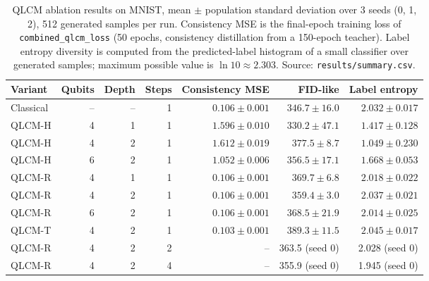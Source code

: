 \begin{table}[t]
\centering
\caption{QLCM ablation results on MNIST, mean $\pm$ population standard
deviation over 3 seeds (0, 1, 2), 512 generated samples per run. Consistency
MSE is the final-epoch training loss of \texttt{combined\_qlcm\_loss} (50
epochs, consistency distillation from a 150-epoch teacher). Label entropy
diversity is computed from the predicted-label histogram of a small
classifier over generated samples; maximum possible value is
$\ln 10 \approx 2.303$. Source: \texttt{results/summary.csv}.}
\label{tab:ablation}
\begin{tabular}{lrrrrrr}
\toprule
Variant & Qubits & Depth & Steps & Consistency MSE & FID-like & Label entropy \\
\midrule
Classical & -- & -- & 1 & $0.106 \pm 0.001$ & $346.7 \pm 16.0$ & $2.032 \pm 0.017$ \\
QLCM-H & 4 & 1 & 1 & $1.596 \pm 0.010$ & $330.2 \pm 47.1$ & $1.417 \pm 0.128$ \\
QLCM-H & 4 & 2 & 1 & $1.612 \pm 0.019$ & $377.5 \pm 8.7$ & $1.049 \pm 0.230$ \\
QLCM-H & 6 & 2 & 1 & $1.052 \pm 0.006$ & $356.5 \pm 17.1$ & $1.668 \pm 0.053$ \\
QLCM-R & 4 & 1 & 1 & $0.106 \pm 0.001$ & $369.7 \pm 6.8$ & $2.018 \pm 0.022$ \\
QLCM-R & 4 & 2 & 1 & $0.106 \pm 0.001$ & $359.4 \pm 3.0$ & $2.037 \pm 0.021$ \\
QLCM-R & 6 & 2 & 1 & $0.106 \pm 0.001$ & $368.5 \pm 21.9$ & $2.014 \pm 0.025$ \\
QLCM-T & 4 & 2 & 1 & $0.103 \pm 0.001$ & $389.3 \pm 11.5$ & $2.045 \pm 0.017$ \\
QLCM-R & 4 & 2 & 2 & -- & 363.5 (seed 0) & 2.028 (seed 0) \\
QLCM-R & 4 & 2 & 4 & -- & 355.9 (seed 0) & 1.945 (seed 0) \\
\bottomrule
\end{tabular}
\end{table}
